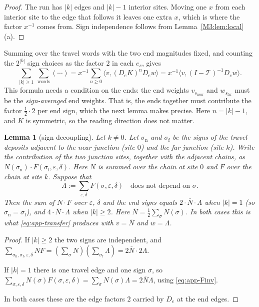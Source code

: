 \documentclass[11pt]{article}
\theoremstyle{plain}
\newtheorem{lemma}[theorem]{Lemma}
\theoremstyle{definition}
\theoremstyle{remark}
\begin{document}
\begin{proof}
The run has $|k|$ edges and $|k|-1$ interior sites. Moving one $x$ from each interior site to
the edge that follows it leaves one extra $x$, which is where the factor $x^{-1}$ comes from.
Sign independence follows from Lemma~\ref{M3:lem:local}(a).
\end{proof}

Summing over the travel words with the two end magnitudes fixed, and counting the $2^{|k|}$
sign choices as the factor $2$ in each $e_s$, gives
\begin{equation}\label{eq:app-transfer}
  \sum_{|k|\ge1}\ \sum_{\text{words}}(\cdots)=x^{-1}\sum_{n\ge0}\bigl\langle v,(D_eK)^nD_ew\bigr\rangle
  =x^{-1}\bigl\langle v,(I-\mathcal T)^{-1}D_ew\bigr\rangle .
\end{equation}
This formula needs a condition on the ends: the end weights $v_{s_{\mathrm{near}}}$ and
$w_{s_{\mathrm{far}}}$ must be the \emph{sign-averaged} end weights. That is, the ends
together must contribute the factor $\tfrac12\cdot2$ per end sign, which the next lemma makes
precise. Here $n=|k|-1$, and $K$ is symmetric, so the reading direction does not matter.

\begin{lemma}[sign decoupling]\label{M3:lem:sign}
Let $k\ne0$. Let $\sigma_{\mathrm n}$ and $\sigma_{\mathrm f}$ be the signs of the travel
deposits adjacent to the near junction (site $0$) and the far junction (site $k$). Write
the contribution of the two junction sites, together with the adjacent chains, as
$N(\sigma_{\mathrm n})\cdot F(\sigma_{\mathrm f},\varepsilon,\delta)$. Here $N$ is summed
over the chain at site $0$ and $F$ over the chain at site $k$. Suppose that
\begin{equation}\label{eq:app-Finv}
  \Lambda:=\sum_{\varepsilon,\delta}F(\sigma,\varepsilon,\delta)\quad\text{does not depend on }\sigma .
\end{equation}
Then the sum of $N\cdot F$ over $\varepsilon$, $\delta$ and the end signs equals
$2\cdot\overline N\cdot\Lambda$ when $|k|=1$ (so $\sigma_{\mathrm n}=\sigma_{\mathrm f}$), and
$4\cdot\overline N\cdot\Lambda$ when $|k|\ge2$. Here
$\overline N=\tfrac12\sum_\sigma N(\sigma)$. In both cases this is what
\eqref{eq:app-transfer} produces with $v=\overline N$ and $w=\Lambda$.
\end{lemma}

\begin{proof}
If $|k|\ge2$ the two signs are independent, and
$\sum_{\sigma_{\mathrm n},\sigma_{\mathrm f},\varepsilon,\delta}NF
=(\sum_\sigma N)(\sum_{\sigma_{\mathrm f}}\Lambda)=2\overline N\cdot2\Lambda$.

If $|k|=1$ there is one travel edge and one sign $\sigma$, so
$\sum_{\sigma,\varepsilon,\delta}N(\sigma)F(\sigma,\varepsilon,\delta)=\sum_\sigma N(\sigma)\Lambda
=2\overline N\Lambda$, using \eqref{eq:app-Finv}.

In both cases these are the edge factors $2$ carried by $D_e$ at the end edges.
\end{proof}
\end{document}
